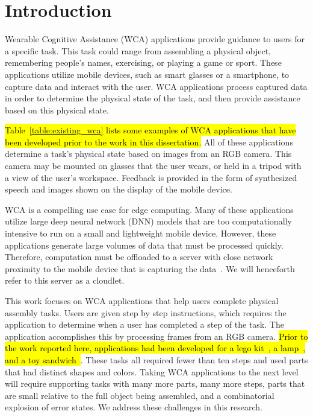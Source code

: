 \chapter{Introduction}\label{chap:intro}

Wearable Cognitive Assistance (WCA) applications provide guidance to users for
a specific task.
This task could range from assembling a physical object, remembering people's
names, exercising, or playing a game or sport.
These applications
utilize mobile devices, such as smart glasses or a smartphone, to capture data
and interact with the user.
WCA applications process captured data in order to determine the physical state
of the task, and then provide assistance based on this physical state.

\hl{
  Table~{\ref{table:existing_wca}} lists some examples of WCA applications that
  have been developed prior to the work in this dissertation.}
All of these applications determine a task's physical state based on images from
an RGB camera.
This camera may be mounted on glasses that the user wears, or held in a tripod
with a view of the user's workspace.
Feedback is provided in the form of synthesized speech and images shown on the
display of the mobile device.

WCA is a compelling use case for edge computing. Many of these applications
utilize large deep neural network (DNN) models that are too computationally
intensive to run on a small and lightweight mobile device. However, these
applications generate large volumes of data that must be processed quickly.
Therefore, computation must be offloaded to a server with close network
proximity to the mobile device that is capturing the data~\cite{satya14}. We
will henceforth refer to this server as a cloudlet.

This work focuses on WCA applications that help users complete physical
assembly tasks.
Users are given step by step instructions, which requires the application to
determine when a user has completed a step of the task.
The application accomplishes this by processing frames from an RGB camera.
\hl{Prior to the work reported here, applications had been
developed for a lego kit~{\cite{lego}}, a lamp~{\cite{lamp}}, and a toy
sandwich~{\cite{sandwich}}}.
These tasks all required fewer than ten steps and
used parts that had distinct shapes and colors.
Taking WCA applications to the next level will require supporting tasks with
many more parts, many more steps, parts that are small relative to the full
object being assembled, and a combinatorial explosion of error states.
We address these challenges in this research.

